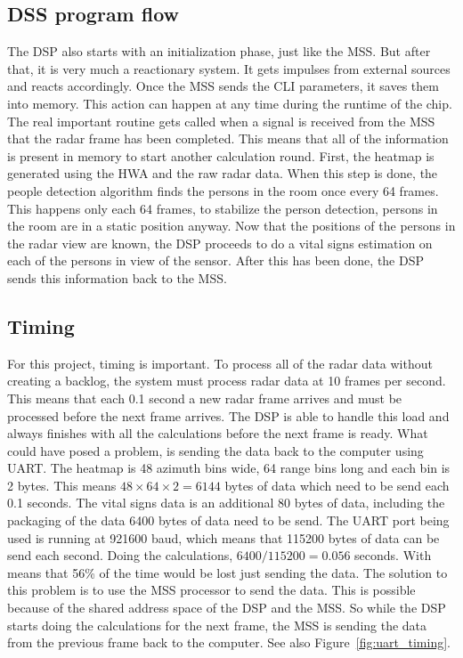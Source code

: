 \subsection{DSS program flow}
The DSP also starts with an initialization phase, just like the MSS. But after that, it is very much a reactionary system. It gets impulses from external sources and reacts accordingly. Once the MSS sends the CLI parameters, it saves them into memory. This action can happen at any time during the runtime of the chip. The real important routine gets called when a signal is received from the MSS that the radar frame has been completed. This means that all of the information is present in memory to start another calculation round. First, the heatmap is generated using the HWA and the raw radar data. When this step is done, the people detection algorithm finds the persons in the room once every 64 frames. This happens only each 64 frames, to stabilize the person detection, persons in the room are in a static position anyway. Now that the positions of the persons in the radar view are known, the DSP proceeds to do a vital signs estimation on each of the persons in view of the sensor. After this has been done, the DSP sends this information back to the MSS.

\subsection{Timing}
For this project, timing is important. To process all of the radar data without creating a backlog, the system must process radar data at 10 frames per second. This means that each 0.1 second a new radar frame arrives and must be processed before the next frame arrives. The DSP is able to handle this load and always finishes with all the calculations before the next frame is ready. What could have posed a problem, is sending the data back to the computer using UART. The heatmap is 48 azimuth bins wide, 64 range bins long and each bin is 2 bytes. This means $48 \times 64 \times 2 = 6144$ bytes of data which need to be send each 0.1 seconds. The vital signs data is an additional 80 bytes of data, including the packaging of the data 6400 bytes of data need to be send. The UART port being used is running at 921600 baud, which means that 115200 bytes of data can be send each second. Doing the calculations, $6400 / 115200 = 0.056$ seconds. With means that 56\% of the time would be lost just sending the data. The solution to this problem is to use the MSS processor to send the data. This is possible because of the shared address space of the DSP and the MSS. So while the DSP starts doing the calculations for the next frame, the MSS is sending the data from the previous frame back to the computer. See also Figure~\ref{fig:uart_timing}.


